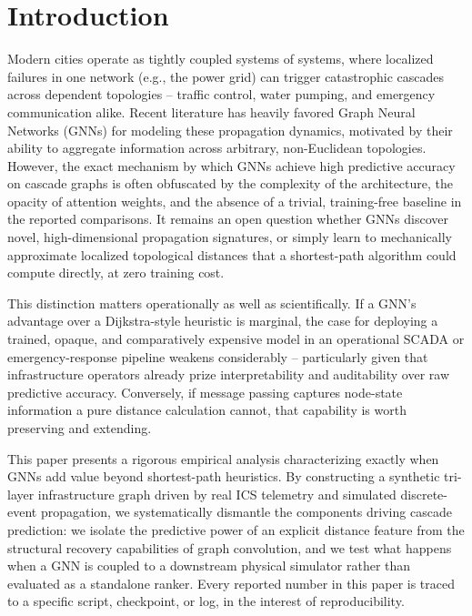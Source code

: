 \documentclass[10pt]{article}
\begin{document}
\section{Introduction}
Modern cities operate as tightly coupled systems of systems, where localized failures in one network (e.g., the power grid) can trigger catastrophic cascades across dependent topologies -- traffic control, water pumping, and emergency communication alike. Recent literature has heavily favored Graph Neural Networks (GNNs) for modeling these propagation dynamics, motivated by their ability to aggregate information across arbitrary, non-Euclidean topologies. However, the exact mechanism by which GNNs achieve high predictive accuracy on cascade graphs is often obfuscated by the complexity of the architecture, the opacity of attention weights, and the absence of a trivial, training-free baseline in the reported comparisons. It remains an open question whether GNNs discover novel, high-dimensional propagation signatures, or simply learn to mechanically approximate localized topological distances that a shortest-path algorithm could compute directly, at zero training cost.

This distinction matters operationally as well as scientifically. If a GNN's advantage over a Dijkstra-style heuristic is marginal, the case for deploying a trained, opaque, and comparatively expensive model in an operational SCADA or emergency-response pipeline weakens considerably -- particularly given that infrastructure operators already prize interpretability and auditability over raw predictive accuracy. Conversely, if message passing captures node-state information a pure distance calculation cannot, that capability is worth preserving and extending.

This paper presents a rigorous empirical analysis characterizing exactly when GNNs add value beyond shortest-path heuristics. By constructing a synthetic tri-layer infrastructure graph driven by real ICS telemetry and simulated discrete-event propagation, we systematically dismantle the components driving cascade prediction: we isolate the predictive power of an explicit distance feature from the structural recovery capabilities of graph convolution, and we test what happens when a GNN is coupled to a downstream physical simulator rather than evaluated as a standalone ranker. Every reported number in this paper is traced to a specific script, checkpoint, or log, in the interest of reproducibility.
\end{document}

